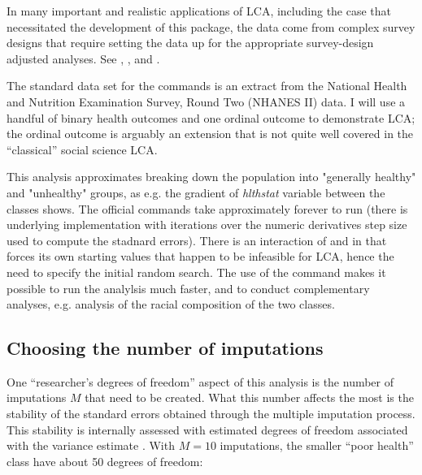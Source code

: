 In many important and realistic applications of LCA, including the case
that necessitated the development of this package, the data come from
complex survey designs that require setting the data up for the appropriate
survey-design adjusted analyses. See , ,
and \citet{kolenikov:pitblado:2014}.

The standard data set for the \svyref{} commands is an extract from 
the National Health and Nutrition Examination Survey, Round Two
(NHANES II) data. I will use a handful of binary health outcomes
and one ordinal outcome to demonstrate LCA; the ordinal outcome
is arguably an extension that is not quite well covered in the
``classical'' social science LCA.

\begin{stlog}
\nullskip
\end{stlog}

This analysis approximates breaking down the population
into "generally healthy" and "unhealthy" groups, as e.g.
the gradient of \textit{hlthstat} variable between the classes
shows. The official  commands
take approximately forever to run (there is underlying
 implementation with iterations over 
the numeric derivatives step size used to compute the stadnard errors).
There is an interaction of  and  in that
 forces its own starting values that happen to be 
infeasible for LCA, hence the need to specify the initial random search.
The use of the  command
makes it possible to run the analylsis much faster,
and to conduct complementary analyses,
e.g. analysis of the racial composition of the two classes.

\begin{stlog}
\nullskip
\end{stlog}

\subsection{Choosing the number of imputations}

One ``researcher's degrees of freedom'' aspect of this analysis
is the number of imputations $M$ that need to be created.
What this number affects the most is the stability of the standard
errors obtained through the multiple imputation process.
This stability is internally assessed with estimated
degrees of freedom associated with the variance estimate
\citep{barnard:rubin:1999}. With $M=10$ imputations,
the smaller ``poor health'' class have about 50 degrees of freedom:

